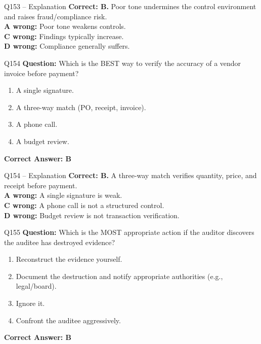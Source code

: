 \documentclass[aspectratio=169,10pt]{beamer}
\begin{document}
	\begin{frame}[t]{Q153 -- Explanation}
		\small
		\textbf{Correct: B.} Poor tone undermines the control environment and raises fraud/compliance risk. \\[4pt]
		\textbf{A wrong:} Poor tone weakens controls. \\[2pt]
		\textbf{C wrong:} Findings typically increase. \\[2pt]
		\textbf{D wrong:} Compliance generally suffers.
	\end{frame}
	
	\begin{frame}[t]{Q154}
		\small
		\textbf{Question:} Which is the BEST way to verify the accuracy of a vendor invoice before payment?
		\begin{enumerate}[label=\Alph*.,itemsep=1pt,topsep=2pt]
			\item A single signature.
			\item A three-way match (PO, receipt, invoice).
			\item A phone call.
			\item A budget review.
		\end{enumerate}
		\vspace{4pt}
		\textbf{Correct Answer: B}
	\end{frame}
	
	\begin{frame}[t]{Q154 -- Explanation}
		\small
		\textbf{Correct: B.} A three-way match verifies quantity, price, and receipt before payment. \\[4pt]
		\textbf{A wrong:} A single signature is weak. \\[2pt]
		\textbf{C wrong:} A phone call is not a structured control. \\[2pt]
		\textbf{D wrong:} Budget review is not transaction verification.
	\end{frame}
	
	\begin{frame}[t]{Q155}
		\small
		\textbf{Question:} Which is the MOST appropriate action if the auditor discovers the auditee has destroyed evidence?
		\begin{enumerate}[label=\Alph*.,itemsep=1pt,topsep=2pt]
			\item Reconstruct the evidence yourself.
			\item Document the destruction and notify appropriate authorities (e.g., legal/board).
			\item Ignore it.
			\item Confront the auditee aggressively.
		\end{enumerate}
		\vspace{4pt}
		\textbf{Correct Answer: B}
	\end{frame}
	
\end{document}
